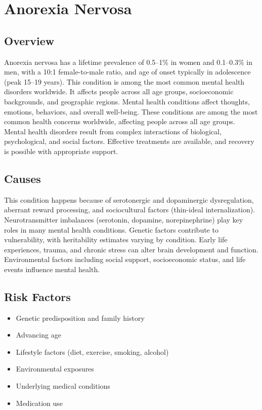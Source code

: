 \chapter{Anorexia Nervosa}
\label{sec:Anorexia Nervosa}

\section{Overview}
Anorexia nervosa has a lifetime prevalence of 0.5--1\% in women and 0.1--0.3\% in men, with a 10:1 female-to-male ratio, and age of onset typically in adolescence (peak 15--19 years). This condition is among the most common mental health disorders worldwide. It affects people across all age groups, socioeconomic backgrounds, and geographic regions. Mental health conditions affect thoughts, emotions, behaviors, and overall well-being. These conditions are among the most common health concerns worldwide, affecting people across all age groups. Mental health disorders result from complex interactions of biological, psychological, and social factors. Effective treatments are available, and recovery is possible with appropriate support.
\section{Causes}
This condition happens because of serotonergic and dopaminergic dysregulation, aberrant reward processing, and sociocultural factors (thin-ideal internalization).  Neurotransmitter imbalances (serotonin, dopamine, norepinephrine) play key roles in many mental health conditions. Genetic factors contribute to vulnerability, with heritability estimates varying by condition. Early life experiences, trauma, and chronic stress can alter brain development and function. Environmental factors including social support, socioeconomic status, and life events influence mental health.   
\section{Risk Factors}
\begin{itemize}[noitemsep]
  \item Genetic predisposition and family history
  \item Advancing age
  \item Lifestyle factors (diet, exercise, smoking, alcohol)
  \item Environmental exposures
  \item Underlying medical conditions
  \item Medication use
\end{itemize}

